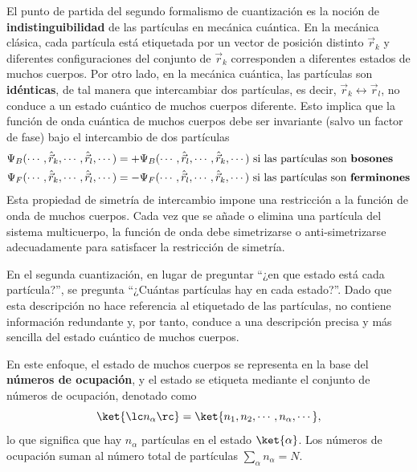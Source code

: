     
        El punto de partida del segundo formalismo de cuantización es la noción de \textbf{indistinguibilidad} de las partículas en mecánica cuántica. En la mecánica clásica, cada partícula está etiquetada por un vector de posición distinto $\vec{r}_k$ y diferentes configuraciones del conjunto de $\vec{r}_k$ corresponden a diferentes estados de muchos cuerpos. Por otro lado,  en la mecánica cuántica, las partículas son \textbf{idénticas}, de tal manera que intercambiar dos partículas, es decir, $\vec{r}_k \leftrightarrow \vec{r}_l$, no conduce a un estado cuántico de muchos cuerpos diferente. Esto implica que la función de onda cuántica de muchos cuerpos debe ser invariante (salvo un factor de fase) bajo el intercambio de dos partículas
        \begin{equation}
            \begin{aligned}
                \Psi_B (\cdots, \hat{\vec{r}}_k, \cdots, \hat{\vec{r}}_l, \cdots) &= + \Psi_B (\cdots, \hat{\vec{r}}_l, \cdots, \hat{\vec{r}}_k, \cdots)  \text{ si las partículas son \textbf{bosones}} \\
                \Psi_F (\cdots, \hat{\vec{r}}_k, \cdots, \hat{\vec{r}}_l, \cdots) &= - \Psi_F (\cdots, \hat{\vec{r}}_l, \cdots, \hat{\vec{r}}_k, \cdots)  \text{ si las partículas son \textbf{ferminones}} 
            \end{aligned}
        \end{equation}
        Esta propiedad de simetría de intercambio impone una restricción a la función de onda de muchos cuerpos. Cada vez que se añade o elimina una partícula del sistema multicuerpo, la función de onda debe simetrizarse o anti-simetrizarse adecuadamente para satisfacer la restricción de simetría.




        En el segunda cuantización, en lugar de preguntar ``¿en que estado está cada partícula?'', se pregunta ``¿Cuántas partículas hay en cada estado?''. Dado que esta descripción no hace referencia al etiquetado de las partículas, no contiene información redundante y, por tanto, conduce a una descripción precisa y más sencilla del estado cuántico de muchos cuerpos. 
        
        En este enfoque, el estado de muchos cuerpos se representa en la base del \textbf{números de ocupación}, y el estado se etiqueta mediante el conjunto de números de ocupación, denotado como
        \begin{equation}
            \ket{\lc n_\alpha \rc} = \ket{n_1, n_2, \cdots, n_\alpha, \cdots},
        \end{equation}
        lo que significa que hay $n_\alpha$ partículas en el estado $\ket{\alpha}$. Los números de ocupación suman al número total de partículas $\sum_\alpha n_\alpha = N$.

